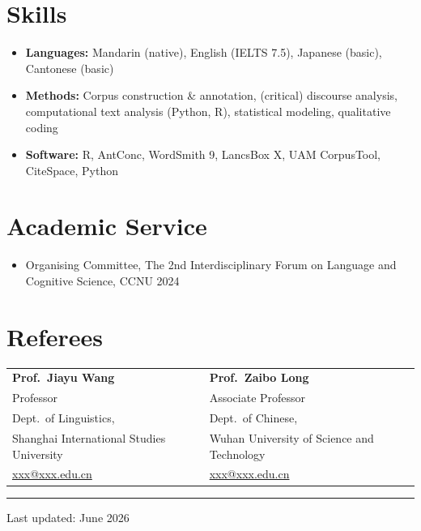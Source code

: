 \documentclass[10pt,a4paper]{article}
\begin{document}
\section{Skills}

\begin{itemize}
  \item \textbf{Languages:} Mandarin (native), English (IELTS 7.5), Japanese (basic), Cantonese (basic)
  \item \textbf{Methods:} Corpus construction \& annotation, (critical) discourse analysis, computational text analysis (Python, R), statistical modeling, qualitative coding
  \item \textbf{Software:} R, AntConc, WordSmith 9, LancsBox X, UAM CorpusTool, CiteSpace, Python
\end{itemize}

\section{Academic Service}

\begin{itemize}
  \item Organising Committee, The 2nd Interdisciplinary Forum on Language and Cognitive Science, CCNU \hfill 2024
\end{itemize}

\section{Referees}

\begin{tabularx}{\textwidth}{XX}
  \textbf{Prof.\ Jiayu Wang} & \textbf{Prof.\ Zaibo Long} \\
  Professor & Associate Professor \\
  Dept.\ of Linguistics, & Dept.\ of Chinese, \\
  Shanghai International Studies University & Wuhan University of Science and Technology \\
  \href{mailto:xxx@xxx.edu.cn}{xxx@xxx.edu.cn} & \href{mailto:xxx@xxx.edu.cn}{xxx@xxx.edu.cn} \\
\end{tabularx}

\vspace{0.3em}

\rule{\textwidth}{0.5pt}
\vspace{0.1em}
\begin{center}
  \footnotesize
  Last updated: June 2026
\end{center}
\end{document}
